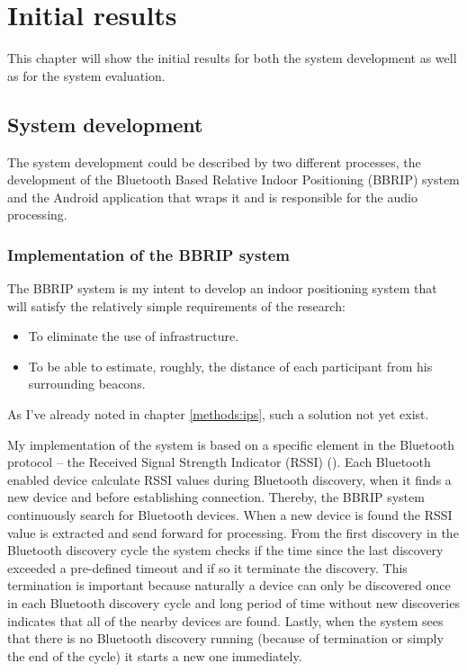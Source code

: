 \section{Initial results}

This chapter will show the initial results for both the system development as well as for the system evaluation.

\subsection{System development}

The system development could be described by two different processes, the development of the Bluetooth Based Relative Indoor Positioning (BBRIP) system and the Android application that wraps it and is responsible for the audio processing.

\subsubsection{Implementation of the BBRIP system}

The BBRIP system is my intent to develop an indoor positioning system that will satisfy the relatively simple requirements of the research:
\begin{itemize}
	\item To eliminate the use of infrastructure.
	\item To be able to estimate, roughly, the distance of each participant from his surrounding beacons.
\end{itemize}

As I've already noted in chapter \ref{methods:ips}, such a solution not yet exist.

My implementation of the system is based on a specific element in the Bluetooth protocol -- the Received Signal Strength Indicator (RSSI) (). Each Bluetooth enabled device calculate RSSI values during Bluetooth discovery, when it finds a new device and before establishing connection. Thereby, the BBRIP system continuously search for Bluetooth devices. When a new device is found the RSSI value is extracted and send forward for processing. From the first discovery in the Bluetooth discovery cycle the system checks if the time since the last discovery exceeded a pre-defined timeout and if so it terminate the discovery. This termination is important because naturally a device can only be discovered once in each Bluetooth discovery cycle and long period of time without new discoveries indicates that all of the nearby devices are found. Lastly, when the system sees that there is no Bluetooth discovery running (because of termination or simply the end of the cycle) it starts a new one immediately.

